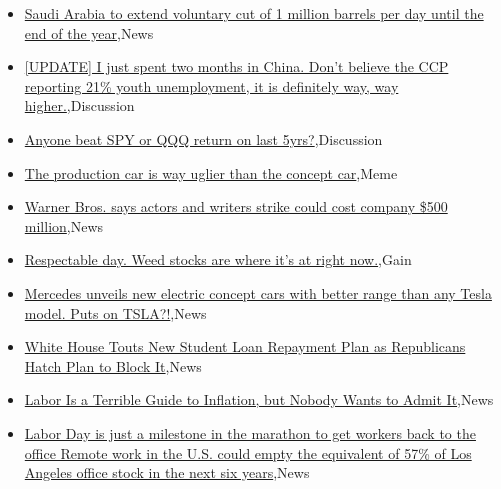 \documentclass{article}%
\begin{document}
%
\begin{itemize}%
\item%
\href{https://reddit.com/r/wallstreetbets/comments/16bf42w/saudi\_arabia\_to\_extend\_voluntary\_cut\_of\_1\_million/}{Saudi Arabia to extend voluntary cut of 1 million barrels per day until the end of the year},News%
\item%
\href{https://reddit.com/r/wallstreetbets/comments/16basc5/update\_i\_just\_spent\_two\_months\_in\_china\_dont/}{[UPDATE] I just spent two months in China. Don't believe the CCP reporting 21\% youth unemployment, it is definitely way, way higher.},Discussion%
\item%
\href{https://reddit.com/r/wallstreetbets/comments/16b9hj9/anyone\_beat\_spy\_or\_qqq\_return\_on\_last\_5yrs/}{Anyone beat SPY or QQQ return on last 5yrs?},Discussion%
\item%
\href{https://reddit.com/r/wallstreetbets/comments/16b9ecl/the\_production\_car\_is\_way\_uglier\_than\_the\_concept/}{The production car is way uglier than the concept car},Meme%
\item%
\href{https://reddit.com/r/wallstreetbets/comments/16b78b6/warner\_bros\_says\_actors\_and\_writers\_strike\_could/}{Warner Bros. says actors and writers strike could cost company \$500 million},News%
\item%
\href{https://reddit.com/r/wallstreetbets/comments/16b6vm7/respectable\_day\_weed\_stocks\_are\_where\_its\_at/}{Respectable day. Weed stocks are where it's at right now.},Gain%
\item%
\href{https://reddit.com/r/StockMarket/comments/16b72u1/mercedes\_unveils\_new\_electric\_concept\_cars\_with/}{Mercedes unveils new electric concept cars with better range than any Tesla model. Puts on TSLA?!},News%
\item%
\href{https://reddit.com/r/Economics/comments/16b1pmm/white\_house\_touts\_new\_student\_loan\_repayment\_plan/}{White House Touts New Student Loan Repayment Plan as Republicans Hatch Plan to Block It},News%
\item%
\href{https://reddit.com/r/Economics/comments/16b0xb6/labor\_is\_a\_terrible\_guide\_to\_inflation\_but\_nobody/}{Labor Is a Terrible Guide to Inflation, but Nobody Wants to Admit It},News%
\item%
\href{https://reddit.com/r/Economics/comments/16awtst/labor\_day\_is\_just\_a\_milestone\_in\_the\_marathon\_to/}{Labor Day is just a milestone in the marathon to get workers back to the office  Remote work in the U.S. could empty the equivalent of 57\% of Los Angeles office stock in the next six years},News%
\end{itemize}%
\end{document}
